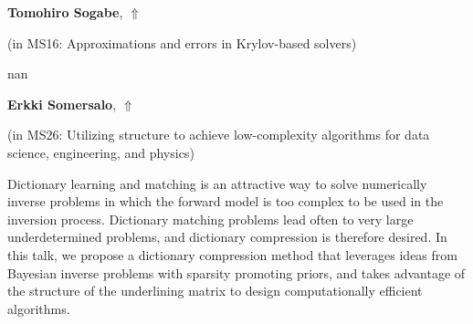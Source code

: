 \documentclass[ILAS2025-program.tex]{subfiles}
\begin{document}
     \hypertarget{down0301}{}\begin{ilasabstract}
    
    \textbf{Tomohiro Sogabe},  \hfill \hyperlink{up0301}{$\Uparrow$}
    
    (in {\color{mstitle}MS16: Approximations and errors in Krylov-based solvers})
        
        \mtskip
    nan\end{ilasabstract}
     \hypertarget{down0027}{}\begin{ilasabstract}
    
    \textbf{Erkki Somersalo},  \hfill \hyperlink{up0027}{$\Uparrow$}
    
    (in {\color{mstitle}MS26: Utilizing structure to achieve low-complexity algorithms for data science, engineering, and physics})
        
        \mtskip
    Dictionary learning and matching is an attractive way to solve numerically inverse problems in which the forward model is too complex to be used in the inversion process.
Dictionary matching problems lead often to very large underdetermined problems, and dictionary compression is therefore desired. In this talk, we propose a dictionary
compression method that leverages ideas from Bayesian inverse problems with sparsity promoting priors, and takes advantage of the structure of the underlining matrix to design computationally efficient algorithms.
\end{ilasabstract}
\end{document}

